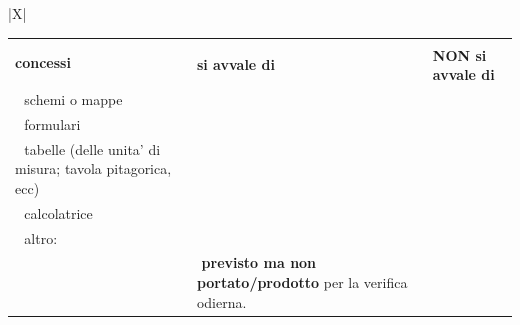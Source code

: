 {\begin{tabularx}{\textwidth}{|X|}
{    {\renewcommand{\arraystretch}{1.5}
        \begin{tabularx}{\dimexpr{}\tabcolsep\relax}{|m{5cm}|>{\centering\arraybackslash}m{4cm}|>{\centering\arraybackslash}X|}
            \hline
            \multirow{2}{=}{\bfseries concessi} &
            \multicolumn{2}{c|}{\bfseries lo studente} \\
            \cline{2-3}
            & \bfseries si avvale di & \bfseries NON si avvale di \\
            \hline
            \xcheckbox\,\, schemi o mappe & \checkbox & \checkbox \\
            \xcheckbox\,\, formulari & \checkbox & \checkbox \\
            \xcheckbox\,\, tabelle (delle unita' di misura; tavola pitagorica, ecc) & \checkbox & \checkbox \\
            \xcheckbox\,\, calcolatrice & \checkbox & \checkbox \\
            \checkbox\,\, altro: \raisebox{-1mm}{\rule{2cm}{0.4pt}}\hspace*{0.5cm} & \checkbox & \checkbox \\
            \hdashline
            \multicolumn{2}{|l|}{
            \parbox{9cm}{\vspace*{0.3cm}In particolare schemi, tabelle e/o mappe risultano essere:\vspace*{0.3cm}\newline
              \hspace*{1cm}\checkbox\,\, \textbf{forniti} dal docente.\newline
              \hspace*{1cm}\checkbox\,\, \textbf{prodotti} dallo studente e
              \vspace*{0.3cm}\newline
                \hspace*{1.5cm}\checkbox\,\, \textbf{concordati} con il docente.\newline
                \hspace*{1.5cm}\raisebox{0cm}{\checkbox\,\, }
                \vspace*{0.3cm}}}
            &
            \parbox{5.9cm}{\vspace*{0.3cm}
            \checkbox\,\,\textbf{previsto ma non portato/prodotto} per la verifica odierna.\newline
}
\end{tabularx}}}
\end{tabularx}}
